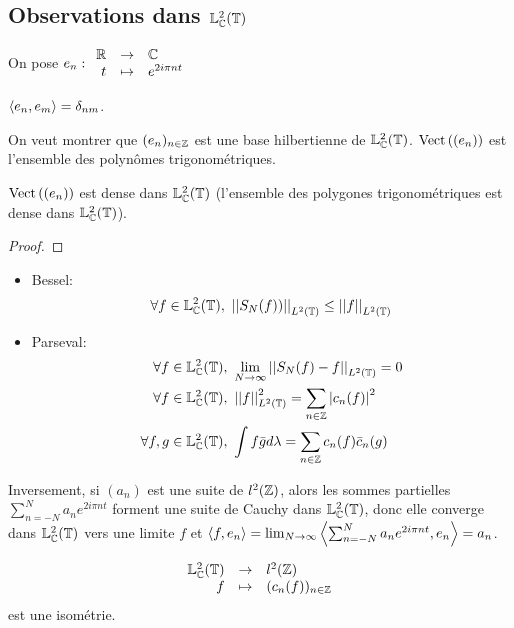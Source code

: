 \subsection{Observations dans $\mathbb{L}^2_{\mathbb{C}}(\mathbb{T})$}


On pose $e_n : \begin{array}{rcl}
		\mathbb{R} & \to     & \mathbb{C}           \\
		t  & \mapsto & e^{2i\pi nt}
	\end{array}$

$\left\langle e_n, e_m \right\rangle = \delta_{nm}$.

On veut montrer que $(e_n)_{n\in \mathbb{Z}}$ est une base hilbertienne de $\mathbb{L}^2_{\mathbb{C}}(\mathbb{T})$.
$\text{Vect}\left( (e_n) \right)$ est l'ensemble  des polynômes trigonométriques.


\begin{theorem}
	$\text{Vect}\left( (e_n) \right)$ est dense dans $\mathbb{L}^2_{\mathbb{C}}(\mathbb{T})$ (l'ensemble des polygones trigonométriques est dense dans $\mathbb{L}^2_{\mathbb{C}}(\mathbb{T})$).
\end{theorem}

\begin{proof}
\end{proof}


\begin{coro}[Conséquences]

	\begin{itemize}
		\item Bessel: $$\forall f \in \mathbb{L}^2_{\mathbb{C}}(\mathbb{T}), \ \left|\left|S_N(f))\right|\right|_{L^2(\mathbb{T})} \leq \left|\left|f\right|\right|_{L^2(\mathbb{T})}$$
		\item Parseval:
		      \begin{eqnarray*}
			      \forall f \in \mathbb{L}^2_{\mathbb{C}}(\mathbb{T}),& \ \lim_{N\to \infty} \left|\left|S_N(f) - f\right|\right|_{L^2(\mathbb{T})} = 0 \\
			      \forall f \in \mathbb{L}^2_{\mathbb{C}}(\mathbb{T}),& \ \left|\left|f\right|\right|_{L^2(\mathbb{T})}^2 = \sum_{n\in \mathbb{Z}} \left|c_n(f)\right|^2 \\
			      \forall f, g \in \mathbb{L}^2_{\mathbb{C}}(\mathbb{T}),& \ \int f\bar g d \lambda = \sum_{n\in \mathbb{Z}} c_n(f) \bar c_n(g)
		      \end{eqnarray*}
	\end{itemize}

	Inversement, si $(a_n)$ est une suite de $l^2(\mathbb{Z})$, alors les sommes partielles $\sum_{n=-N}^N a_n e^{2i\pi nt}$ forment
	une suite de Cauchy dans $\mathbb{L}^2_{\mathbb{C}}(\mathbb{T})$, donc elle converge dans $\mathbb{L}^2_{\mathbb{C}}(\mathbb{T})$ vers une limite $f$ et
	$\left\langle f, e_n \right\rangle = \lim_{N\to \infty} \left\langle \sum_{n=-N}^N a_n e^{2i\pi nt}, e_n \right\rangle = a_n$.
\end{coro}


\begin{theorem}
	$$\begin{array}{rcl}
			\mathbb{L}^2_{\mathbb{C}}(\mathbb{T}) & \to     & l^2(\mathbb{Z})            \\
			f            & \mapsto & (c_n(f))_{n\in \mathbb{Z}}
		\end{array}$$ est une isométrie.
\end{theorem}
